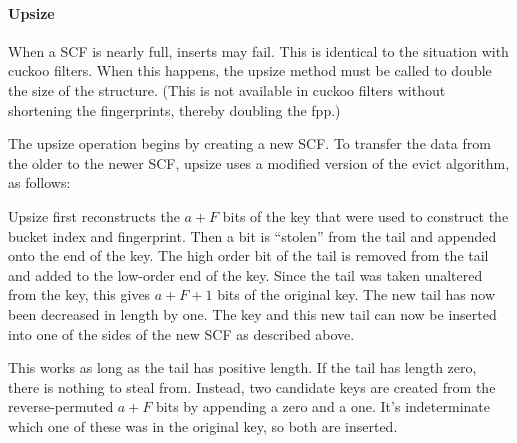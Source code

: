 \documentclass[letterpaper,twocolumn,10pt]{article}
\newcommand{\ints}{\mathbb{Z}}
\newcommand{\dotcup}{\ensuremath{\mathaccent\cdot\cup}}
\newcommand{\TCF}{SCF}
\newcommand{\TCF}{TCF}
\begin{document}



\paragraph{Upsize}
When a \TCF{} is nearly full, inserts may fail.
This is identical to the situation with cuckoo filters.
When this happens, the upsize method must be called to double the size of the structure. %
(This is not available in cuckoo filters without shortening the fingerprints, thereby doubling the fpp.)

The upsize operation begins by creating a new \TCF{}. %
To transfer the data from the older to the newer \TCF{}, upsize uses a modified version of the evict algorithm, as follows:

Upsize first reconstructs the $a+F$ bits of the key that were used to construct the bucket index and fingerprint. %
Then a bit is ``stolen'' from the tail and appended onto the end of the key. %
The high order bit of the tail is removed from the tail and added to the low-order end of the key.
Since the tail was taken unaltered from the key, this gives $a+F+1$ bits of the original key.
The new tail has now been decreased in length by one.
The key and this new tail can now be inserted into one of the sides of the new \TCF{} as described above. %

This works as long as the tail has positive length.
If the tail has length zero, there is nothing to steal from.
Instead, two candidate keys are created from the reverse-permuted $a+F$ bits by appending a zero and a one. %
It's indeterminate which one of these was in the original key, so both are inserted. %
\end{document}
